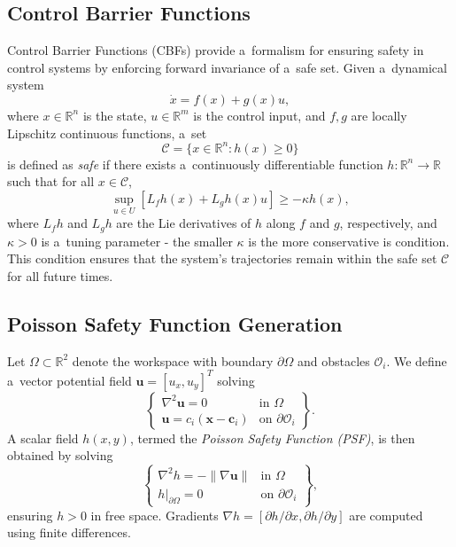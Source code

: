 \documentclass[letterpaper, 10 pt, conference]{ieeeconf}
\begin{document}
\subsection{Control Barrier Functions}
Control Barrier Functions (CBFs) provide a~formalism for ensuring safety in
control systems by enforcing forward invariance of a~safe set. Given a~dynamical
system
\begin{equation}
    \dot{x} = f(x) + g(x)u,
\end{equation}
where $x\in\mathbb{R}^n$ is the state, $u\in\mathbb{R}^m$ is the control input, and
$f,g$ are locally Lipschitz continuous functions, a~set
\begin{equation}
    \mathcal{C} = \{x\in\mathbb{R}^n : h(x) \ge 0\}
\end{equation}
is defined as \emph{safe} if there exists a~continuously differentiable function
$h:\mathbb{R}^n \to \mathbb{R}$ such that for all $x\in\mathcal{C}$,
\begin{equation}
    \sup_{u\in U} [L_f h(x) + L_g h(x) u] \ge -\kappa h(x),
\end{equation}
where $L_f h$ and $L_g h$ are the Lie derivatives of $h$ along $f$ and $g$,
respectively, and $\kappa>0$ is a~tuning parameter - the smaller $\kappa$ is
the more conservative is condition. This condition ensures that the system's
trajectories remain within the safe set $\mathcal{C}$ for all future times.

\subsection{Poisson Safety Function Generation}
Let $\Omega \subset \mathbb{R}^2$ denote the workspace with boundary
$\partial\Omega$ and obstacles $\mathcal{O}_i$. We define a~vector
potential field $\mathbf{u} = [u_x,u_y]^T$ solving
\begin{equation}
    \left\lbrace
    \begin{array}{ll}
        \nabla^2 \mathbf{u} = 0 & \text{in } \Omega \\
        \mathbf{u} = c_i (\mathbf{x}-\mathbf{c}_i) & \text{on } \partial \mathcal{O}_i
    \end{array}
    \right\rbrace
    .
\end{equation}
A scalar field $h(x,y)$, termed the \emph{Poisson Safety Function (PSF)},
is then obtained by solving
\begin{equation}
    \left\lbrace
    \begin{array}{ll}
        \nabla^2 h = -\|\nabla \mathbf{u}\| & \text{in } \Omega \\
        h|_{\partial\Omega}=0 & \text{on } \partial \mathcal{O}_i
    \end{array}
    \right\rbrace
    ,
\end{equation}
ensuring $h>0$ in free space. Gradients $\nabla h = [\partial h/\partial
x,\partial h/\partial y]$ are computed using finite differences.
\end{document}
